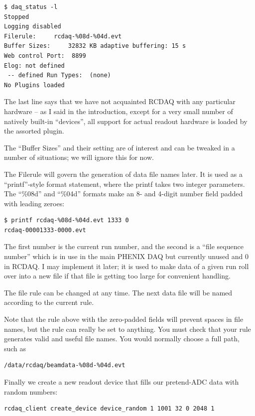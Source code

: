 \documentclass{article}[11pt]
\begin{document}
\begin{verbatim}
$ daq_status -l
Stopped
Logging disabled
Filerule:     rcdaq-%08d-%04d.evt
Buffer Sizes:     32832 KB adaptive buffering: 15 s
Web control Port:  8899
Elog: not defined
 -- defined Run Types:  (none)
No Plugins loaded
\end{verbatim}

The last line says that we have not acquainted RCDAQ with any particular
hardware -- as I said in the introduction, except for a very small
number of natively built-in ``devices'', all support for actual
readout hardware is loaded by the assorted plugin.

The ``Buffer Sizes'' and their setting are of interest and can be
tweaked in a number of situations; we will ignore this for now.

The Filerule will govern the generation of data file names later. It
is used as a ``printf''-style format statement, where the printf takes
two integer parameters. The ``\%08d'' and ``\%04d'' formats make an 8-
and 4-digit number field padded with leading zeroes:

\begin{verbatim}
$ printf rcdaq-%08d-%04d.evt 1333 0 
rcdaq-00001333-0000.evt
\end{verbatim}

The first number is the current run number, and the second is a ``file
sequence number'' which is in use in the main PHENIX DAQ but currently
unused and 0 in RCDAQ. I may implement it later; it is used to make
data of a given run roll over into a new file if that file is getting
too large for convenient handling. 

The file rule can be changed at any time. The next data file will be
named according to the current rule.

Note that the rule above with the zero-padded fields will prevent
spaces in file names, but the rule can really be set to anything. You
must check that your rule generates valid and useful file names. You
would normally choose a full path, such as

\begin{verbatim}
/data/rcdaq/beamdata-%08d-%04d.evt 
\end{verbatim}


Finally we create a new readout device that fills our pretend-ADC data
with random numbers:

\begin{verbatim}
rcdaq_client create_device device_random 1 1001 32 0 2048 1
\end{verbatim}
\end{document}
